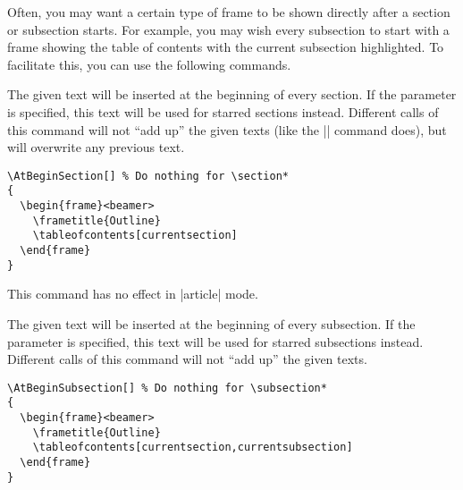Often, you may want a certain type of frame to be shown directly after a section or subsection starts. For example, you may wish every subsection to start with a frame showing the table of contents with the current subsection highlighted. To facilitate this, you can use the following commands.

\begin{command}{\AtBeginSection{}}
  The given text will be inserted at the beginning of every section. If the  parameter is specified, this text will be used for starred sections instead. Different calls of this command will not ``add up'' the given texts (like the |\AtBeginDocument| command does), but will overwrite any previous text.

  \example
\begin{verbatim}
\AtBeginSection[] % Do nothing for \section*
{
  \begin{frame}<beamer>
    \frametitle{Outline}
    \tableofcontents[currentsection]
  \end{frame}
}
\end{verbatim}

  \articlenote
  This command has no effect in |article| mode.

\end{command}

\begin{command}{\AtBeginSubsection{}}
  The given text will be inserted at the beginning of every subsection. If the  parameter is specified, this text will be used for starred subsections instead. Different calls of this command will not ``add up'' the given texts.

  \example
\begin{verbatim}
\AtBeginSubsection[] % Do nothing for \subsection*
{
  \begin{frame}<beamer>
    \frametitle{Outline}
    \tableofcontents[currentsection,currentsubsection]
  \end{frame}
}
\end{verbatim}
\end{command}

